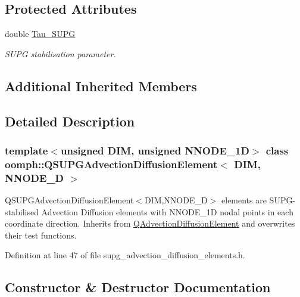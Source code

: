 \subsection*{Protected Attributes}
\begin{DoxyCompactItemize}
\item 
double \hyperlink{classoomph_1_1QSUPGAdvectionDiffusionElement_aa1caa73d77fcc84d91c531cb71a4f27e}{Tau\+\_\+\+S\+U\+PG}
\begin{DoxyCompactList}\small\item\em S\+U\+PG stabilisation parameter. \end{DoxyCompactList}\end{DoxyCompactItemize}
\subsection*{Additional Inherited Members}


\subsection{Detailed Description}
\subsubsection*{template$<$unsigned D\+IM, unsigned N\+N\+O\+D\+E\+\_\+1D$>$\newline
class oomph\+::\+Q\+S\+U\+P\+G\+Advection\+Diffusion\+Element$<$ D\+I\+M, N\+N\+O\+D\+E\+\_\+D $>$}

Q\+S\+U\+P\+G\+Advection\+Diffusion\+Element$<$\+D\+I\+M,\+N\+N\+O\+D\+E\+\_\+D$>$ elements are S\+U\+P\+G-\/stabilised Advection Diffusion elements with N\+N\+O\+D\+E\+\_\+1D nodal points in each coordinate direction. Inherits from \hyperlink{classoomph_1_1QAdvectionDiffusionElement}{Q\+Advection\+Diffusion\+Element} and overwrites their test functions. 

Definition at line 47 of file supg\+\_\+advection\+\_\+diffusion\+\_\+elements.\+h.



\subsection{Constructor \& Destructor Documentation}
\mbox{\label{classoomph_1_1QSUPGAdvectionDiffusionElement_ad5b142914b89f193f32967997e42d1a2}} 

